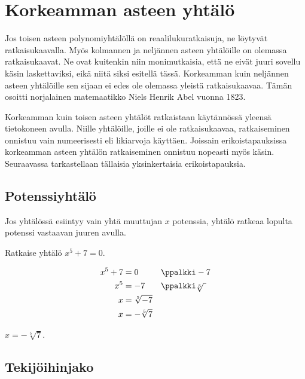 \section{Korkeamman asteen yhtälö}


Jos toisen asteen polynomiyhtälöllä on reaalilukuratkaisuja, ne löytyvät ratkaisukaavalla. Myös kolmannen ja neljännen asteen yhtälöille on olemassa ratkaisukaavat. Ne ovat kuitenkin niin monimutkaisia, että ne eivät juuri sovellu käsin laskettaviksi, eikä niitä siksi esitellä tässä. Korkeamman kuin neljännen asteen yhtälöille sen sijaan ei edes ole olemassa yleistä ratkaisukaavaa. Tämän osoitti norjalainen matemaatikko Niels Henrik Abel vuonna 1823.

Korkeamman kuin toisen asteen yhtälöt ratkaistaan käytännössä yleensä tietokoneen avulla. Niille yhtälöille, joille ei ole ratkaisukaavaa, ratkaiseminen onnistuu vain numeerisesti eli likiarvoja käyttäen. Joissain erikoistapauksissa korkeamman asteen yhtälön ratkaiseminen onnistuu nopeasti myös käsin. Seuraavassa tarkastellaan tällaisia yksinkertaisia erikoistapauksia.

\subsection*{Potenssiyhtälö}

Jos yhtälössä esiintyy vain yhtä muuttujan $x$ potenssia, yhtälö ratkeaa lopulta potenssi vastaavan juuren avulla.

\begin{esimerkki}
Ratkaise yhtälö $x^5+7=0$.

	\begin{esimratk}
\begin{align*}
x^5+7 &= 0 && \ppalkki -7 \\
x^5 &= -7 && \ppalkki \sqrt[5]{ \ } \\
x &= \sqrt[5]{-7} \\
x &= -\sqrt[5]{7}
\end{align*} 
	\end{esimratk}

	\begin{esimvast} $x = -\sqrt[5]{7}$.
	\end{esimvast}
\end{esimerkki}

\subsection*{Tekijöihinjako}

